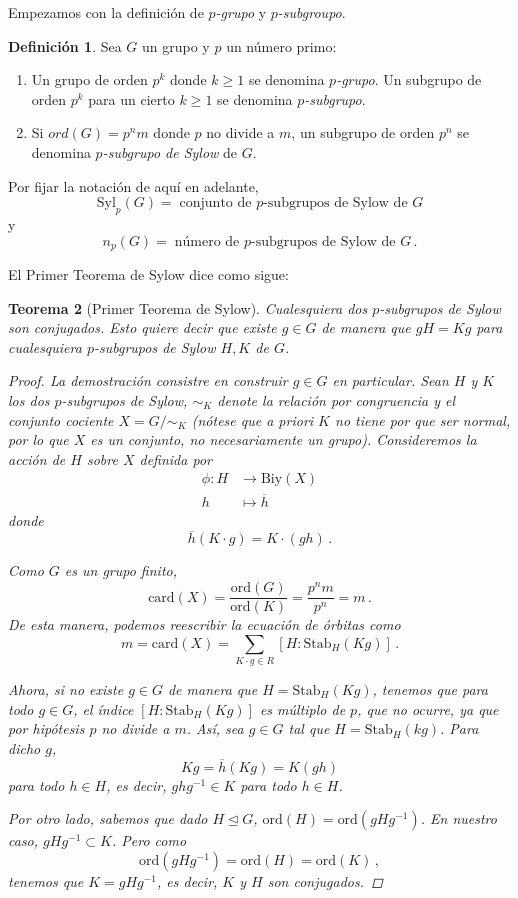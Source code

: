\documentclass[a4paper,11pt]{amsart}
\theoremstyle{plain}
\newtheorem{thm}{Teorema}[section]
\theoremstyle{definition}
\newtheorem{defi}[thm]{Definición}
\theoremstyle{remark}
\begin{document}
Empezamos con la definición de \textit{$p$-grupo} y \textit{$p$-subgroupo}.

\begin{defi}
Sea $G$ un grupo y $p$ un número primo:
\begin{enumerate}[label = \arabic*)]
    \item Un grupo de orden $p^k$ donde $k \geq 1$ se denomina \textit{$p$-grupo}. Un subgrupo de orden $p^k$ para un cierto $k \geq 1$ se denomina \textit{$p$-subgrupo}.
    \item Si $\textit{ord}(G) = p^n m$ donde $p$ no divide a $m$, un subgrupo de orden $p^n$ se denomina \textit{$p$-subgrupo de Sylow} de $G$.
\end{enumerate}
\end{defi}

Por fijar la notación de aquí en adelante, 
\[ \text{Syl}_p(G) = \; \text{conjunto de $p$-subgrupos de Sylow de $G$}\]
y 
\[ n_p(G) = \; \text{número de $p$-subgrupos de Sylow de $G$} \, . \]


El Primer Teorema de Sylow dice como sigue:

\begin{thm}[Primer Teorema de Sylow]
Cualesquiera dos $p$-subgrupos de Sylow son conjugados. Esto quiere decir que existe $g \in G$ de manera que $g H = K g$ para cualesquiera $p$-subgrupos de Sylow $H, K$ de $G$.
\begin{proof}
La demostración consistre en construir $g \in G$ en particular. Sean $H$ y $K$ los dos $p$-subgrupos de Sylow, $\sim_K$ denote la relación por congruencia y el conjunto cociente $X = G/\sim_K$ (nótese que a priori $K$ no tiene por que ser normal, por lo que $X$ es un conjunto, no necesariamente un grupo). Consideremos la acción de $H$ sobre $X$ definida por 
\begin{align*}
    \phi \colon H & \to \text{Biy}(X)\\
    h & \mapsto \overline{h}
\end{align*}
donde 
\[ \overline{h}(K \cdot g) = K \cdot (gh) \, . \]

Como $G$ es un grupo finito, 
\[ \text{card}(X) = \frac{\text{ord}(G)}{\text{ord}(K)} = \frac{p^n m}{p^n} = m \, . \]
De esta manera, podemos reescribir la ecuación de órbitas como 
\[ m = \text{card}(X) = \sum_{K \cdot g \in R}[H : \text{Stab}_H(Kg)] \, . \]

Ahora, si no existe $g \in G$ de manera que $H = \text{Stab}_H(Kg)$, tenemos que para todo $g \in G$, el índice $[H : \text{Stab}_H(Kg)]$ es múltiplo de $p$, que no ocurre, ya que por hipótesis $p$ no divide a $m$. Así, sea $g \in G$ tal que $H = \text{Stab}_H(kg)$. Para dicho $g$, 
\[ K g = \overline{h}(Kg) = K(gh)\]
para todo $h \in H$, es decir, $g h g^{-1} \in K$ para todo $h \in H$. 

Por otro lado, sabemos que dado $H \unlhd G$, $\text{ord}(H) = \text{ord}(gHg^{-1})$. En nuestro caso, $gHg^{-1} \subset K$. Pero como 
\[ \text{ord}(gHg^{-1}) = \text{ord}(H) = \text{ord}(K) \, , \]
tenemos que $K = gHg^{-1}$, es decir, $K$ y $H$ son conjugados.
\end{proof}
\end{thm}
\end{document}
